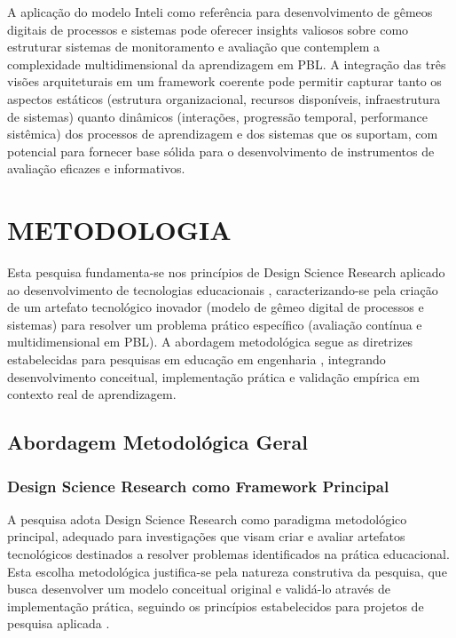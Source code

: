 \documentclass[12pt,a4paper]{article}
\begin{document}
A aplicação do modelo Inteli como referência para desenvolvimento de gêmeos digitais de processos e sistemas pode oferecer insights valiosos sobre como estruturar sistemas de monitoramento e avaliação que contemplem a complexidade multidimensional da aprendizagem em PBL. A integração das três visões arquiteturais em um framework coerente pode permitir capturar tanto os aspectos estáticos (estrutura organizacional, recursos disponíveis, infraestrutura de sistemas) quanto dinâmicos (interações, progressão temporal, performance sistêmica) dos processos de aprendizagem e dos sistemas que os suportam, com potencial para fornecer base sólida para o desenvolvimento de instrumentos de avaliação eficazes e informativos.

\section{METODOLOGIA}

Esta pesquisa fundamenta-se nos princípios de Design Science Research aplicado ao desenvolvimento de tecnologias educacionais \cite{gil91}, caracterizando-se pela criação de um artefato tecnológico inovador (modelo de gêmeo digital de processos e sistemas) para resolver um problema prático específico (avaliação contínua e multidimensional em PBL). A abordagem metodológica segue as diretrizes estabelecidas para pesquisas em educação em engenharia \cite{andrade99}, integrando desenvolvimento conceitual, implementação prática e validação empírica em contexto real de aprendizagem.

\subsection{Abordagem Metodológica Geral}

\subsubsection{Design Science Research como Framework Principal}

A pesquisa adota Design Science Research como paradigma metodológico principal, adequado para investigações que visam criar e avaliar artefatos tecnológicos destinados a resolver problemas identificados na prática educacional. Esta escolha metodológica justifica-se pela natureza construtiva da pesquisa, que busca desenvolver um modelo conceitual original e validá-lo através de implementação prática, seguindo os princípios estabelecidos para projetos de pesquisa aplicada \cite{gil91}.
\end{document}
